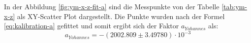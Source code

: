 In  der  Abbildung \ref{fig:ym-x-z-fit-a} sind die Messpunkte  von  der  Tabelle
\ref{tab:ym-x-z} als XY-Scatter Plot dargestellt. Die  Punkte  wurden  nach  der
Formel  \ref{eq:kalibration-a}   gefittet  und  somit  ergibt  sich  der  Faktor
$a_{Yohannes}$ als:
\begin{equation}
    a_{Yohannes} = -(2002.809 \pm 3.49780)\cdot 10^{-3}
    \label{eq:ym-a}
\end{equation}
